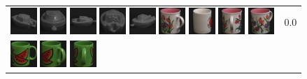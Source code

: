 \begin{figure}[tbp]
\begin{center}
\begin{tabular}{m{11cm} | m{3cm} |}
\includegraphics[width=1cm]{coil/beeld-25.eps}
\includegraphics[width=1cm]{coil/beeld-28.eps}
\includegraphics[width=1cm]{coil/beeld-27.eps}
\includegraphics[width=1cm]{coil/beeld-26.eps}
\includegraphics[width=1cm]{coil/beeld-29.eps}
\includegraphics[width=1cm]{coil/beeld-10.eps}
\includegraphics[width=1cm]{coil/beeld-38.eps}
\includegraphics[width=1cm]{coil/beeld-11.eps}
\includegraphics[width=1cm]{coil/beeld-9.eps}
& {\scriptsize 0.0}
\\
\includegraphics[width=1cm]{coil/beeld-30.eps}
\includegraphics[width=1cm]{coil/beeld-34.eps}
\includegraphics[width=1cm]{coil/beeld-35.eps}

\end{tabular}
\end{center}
\end{figure}
